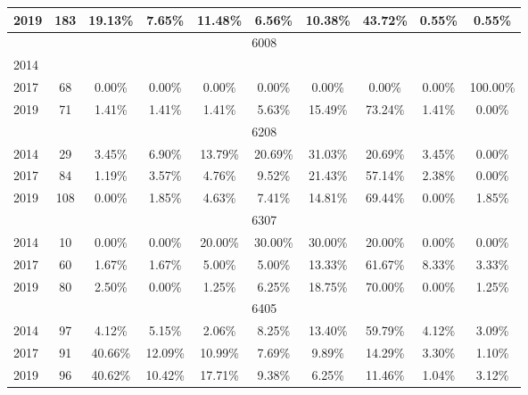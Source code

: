 \begin{table}[H]
\begin{tabular}{|l|c|ccc|ccc|cc|}
2019 & 183 & 19.13\% & 7.65\% & 11.48\% & 6.56\% & 10.38\% & 43.72\% & 0.55\% & 0.55\%\\
\hline
\hline
\multicolumn{10}{|c|}{6008}\\
\hline
2014 & & & & & & & & & \\
2017 & 68 & 0.00\% & 0.00\% & 0.00\% & 0.00\% & 0.00\% & 0.00\% & 0.00\% & 100.00\%\\
2019 & 71 & 1.41\% & 1.41\% & 1.41\% & 5.63\% & 15.49\% & 73.24\% & 1.41\% & 0.00\%\\
\hline
\hline
\multicolumn{10}{|c|}{6208}\\
\hline
2014 & 29 & 3.45\% & 6.90\% & 13.79\% & 20.69\% & 31.03\% & 20.69\% & 3.45\% & 0.00\%\\
2017 & 84 & 1.19\% & 3.57\% & 4.76\% & 9.52\% & 21.43\% & 57.14\% & 2.38\% & 0.00\%\\
2019 & 108 & 0.00\% & 1.85\% & 4.63\% & 7.41\% & 14.81\% & 69.44\% & 0.00\% & 1.85\%\\
\hline
\hline
\multicolumn{10}{|c|}{6307}\\
\hline
2014 & 10 & 0.00\% & 0.00\% & 20.00\% & 30.00\% & 30.00\% & 20.00\% & 0.00\% & 0.00\%\\
2017 & 60 & 1.67\% & 1.67\% & 5.00\% & 5.00\% & 13.33\% & 61.67\% & 8.33\% & 3.33\%\\
2019 & 80 & 2.50\% & 0.00\% & 1.25\% & 6.25\% & 18.75\% & 70.00\% & 0.00\% & 1.25\%\\
\hline
\hline
\multicolumn{10}{|c|}{6405}\\
\hline
2014 & 97 & 4.12\% & 5.15\% & 2.06\% & 8.25\% & 13.40\% & 59.79\% & 4.12\% & 3.09\%\\
2017 & 91 & 40.66\% & 12.09\% & 10.99\% & 7.69\% & 9.89\% & 14.29\% & 3.30\% & 1.10\%\\
2019 & 96 & 40.62\% & 10.42\% & 17.71\% & 9.38\% & 6.25\% & 11.46\% & 1.04\% & 3.12\%\\
\hline
\bottomrule
\end{tabular}
\end{table}
